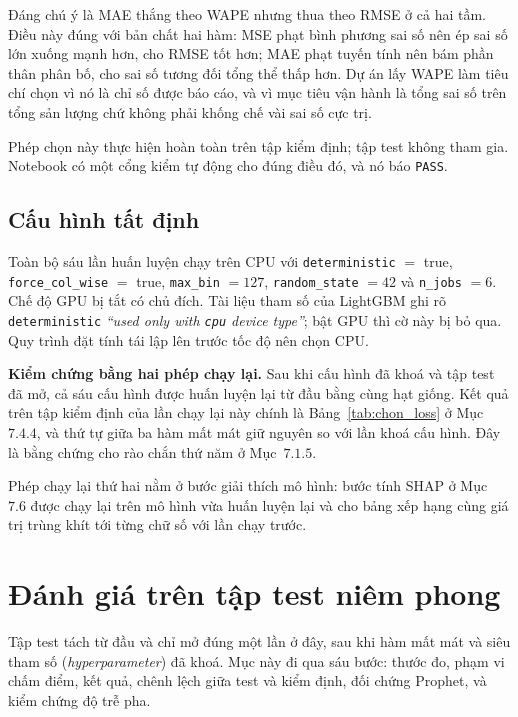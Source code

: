 Đáng chú ý là MAE thắng theo WAPE nhưng thua theo RMSE ở cả hai tầm. Điều này đúng với bản chất
hai hàm: MSE phạt bình phương sai số nên ép sai số lớn xuống mạnh hơn, cho RMSE tốt hơn; MAE
phạt tuyến tính nên bám phần thân phân bố, cho sai số tương đối tổng thể thấp hơn. Dự án lấy
WAPE làm tiêu chí chọn vì nó là chỉ số được báo cáo, và vì mục tiêu vận hành là tổng sai số
trên tổng sản lượng chứ không phải khống chế vài sai số cực trị.

Phép chọn này thực hiện hoàn toàn trên tập kiểm định; tập test không tham gia. Notebook
 có một cổng kiểm tự động cho đúng điều đó, và nó báo
\texttt{PASS}.

\FloatBarrier
\subsection{Cấu hình tất định}

Toàn bộ sáu lần huấn luyện chạy trên CPU với \texttt{deterministic} $=$ true,
\texttt{force\_col\_wise} $=$ true, \texttt{max\_bin} $=127$, \texttt{random\_state} $=42$ và
\texttt{n\_jobs} $=6$. Chế độ GPU bị tắt có chủ đích. Tài liệu tham số của LightGBM ghi rõ
\texttt{deterministic} \textit{``used only with \texttt{cpu} device type''}; bật GPU thì cờ này
bị bỏ qua. Quy trình đặt tính tái lập lên trước tốc độ nên chọn CPU.



\textbf{Kiểm chứng bằng hai phép chạy lại.} Sau khi cấu hình đã khoá và tập test đã mở, cả sáu
cấu hình được huấn luyện lại từ đầu bằng cùng hạt giống. Kết quả trên tập kiểm định của lần
chạy lại này chính là Bảng~\ref{tab:chon_loss} ở Mục~$7.4.4$, và thứ tự giữa ba hàm mất mát giữ
nguyên so với lần khoá cấu hình. Đây là bằng chứng cho rào chắn thứ năm ở Mục~$7.1.5$.

Phép chạy lại thứ hai nằm ở bước giải thích mô hình: bước tính SHAP ở Mục~$7.6$ được chạy lại
trên mô hình vừa huấn luyện lại và cho bảng xếp hạng cùng giá trị trùng khít tới từng chữ số
với lần chạy trước.

\FloatBarrier
\section{Đánh giá trên tập test niêm phong}

Tập test tách từ đầu và chỉ mở đúng một lần ở đây, sau khi hàm mất mát và siêu tham số
(\textit{hyperparameter}) đã khoá. Mục này đi qua sáu bước: thước đo, phạm vi chấm điểm, kết
quả, chênh lệch giữa test và kiểm định, đối chứng Prophet, và kiểm chứng độ trễ pha.

